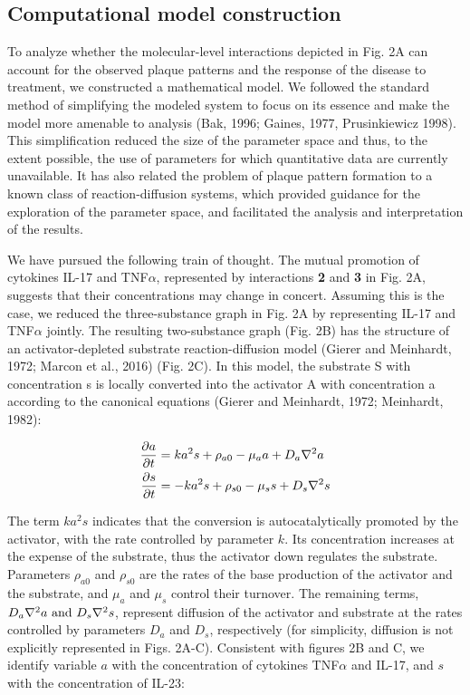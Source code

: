 \subsection{Computational model construction}
To analyze whether the molecular-level interactions depicted in Fig. 2A can account for the observed plaque patterns and the response of the disease to treatment, we constructed a mathematical model. We followed the standard method of simplifying the modeled system to focus on its essence and make the model more amenable to analysis (Bak, 1996; Gaines, 1977, Prusinkiewicz 1998). This simplification reduced the size of the parameter space and thus, to the extent possible, the use of parameters for which quantitative data are currently unavailable. It has also related the problem of plaque pattern formation to a known class of reaction-diffusion systems, which provided guidance for the exploration of the parameter space, and facilitated the analysis and interpretation of the results.
 
We have pursued the following train of thought. The mutual promotion of cytokines IL-17 and TNF$\alpha$, represented by interactions \textbf{2} and \textbf{3} in Fig. 2A, suggests that their concentrations may change in concert. Assuming this is the case, we reduced the three-substance graph in Fig. 2A by representing IL-17 and TNF$\alpha$ jointly. The resulting two-substance graph (Fig. 2B) has the structure of an activator-depleted substrate reaction-diffusion model (Gierer and Meinhardt, 1972; Marcon et al., 2016) (Fig. 2C). In this model, the substrate S with concentration s is locally converted into the activator A with concentration a according to the canonical equations (Gierer and Meinhardt, 1972; Meinhardt, 1982):

\begin{equation}
	\begin{aligned} \label{eq:ahPsoriasis}
	\frac{\partial a}{\partial t} &= ka^2s+\rho_{a0}-\mu_a a + D_a \nabla^2 a \\
	\frac{\partial s}{\partial t} &= -ka^2s+\rho_{s0}-\mu_s s + D_s \nabla^2 s
	\end{aligned}
\end{equation}

The term $ka^2s$ indicates that the conversion is autocatalytically promoted by the activator, with the rate controlled by parameter $k$. Its concentration increases at the expense of the substrate, thus the activator down regulates the substrate. Parameters $\rho_{a0}$ and $\rho_{s0}$ are the rates of the base production of the activator and the substrate, and $\mu_a$ and $\mu_s$ control their turnover. The remaining terms, $D_a \nabla^2 a \text{ and } D_s \nabla^2 s$, represent diffusion of the activator and substrate at the rates controlled by parameters $D_a$ and $D_s$, respectively (for simplicity, diffusion is not explicitly represented in Figs. 2A-C). Consistent with figures 2B and C, we identify variable $a$ with the concentration of cytokines TNF$\alpha$ and IL-17, and $s$ with the concentration of IL-23:

